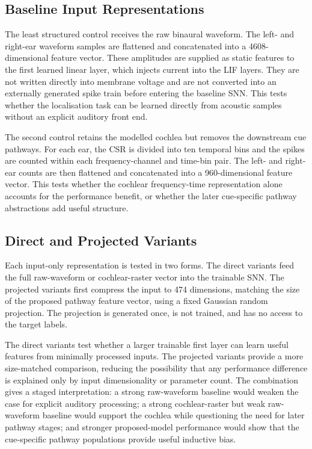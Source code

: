 \subsection{Baseline Input Representations}

The least structured control receives the raw binaural waveform. The left- and right-ear waveform samples are flattened and concatenated into a 4608-dimensional feature vector. These amplitudes are supplied as static features to the first learned linear layer, which injects current into the LIF layers. They are not written directly into membrane voltage and are not converted into an externally generated spike train before entering the baseline SNN. This tests whether the localisation task can be learned directly from acoustic samples without an explicit auditory front end.

The second control retains the modelled cochlea but removes the downstream cue pathways. For each ear, the CSR is divided into ten temporal bins and the spikes are counted within each frequency-channel and time-bin pair. The left- and right-ear counts are then flattened and concatenated into a 960-dimensional feature vector. This tests whether the cochlear frequency-time representation alone accounts for the performance benefit, or whether the later cue-specific pathway abstractions add useful structure.

\subsection{Direct and Projected Variants}

Each input-only representation is tested in two forms. The direct variants feed the full raw-waveform or cochlear-raster vector into the trainable SNN. The projected variants first compress the input to 474 dimensions, matching the size of the proposed pathway feature vector, using a fixed Gaussian random projection. The projection is generated once, is not trained, and has no access to the target labels.

The direct variants test whether a larger trainable first layer can learn useful features from minimally processed inputs. The projected variants provide a more size-matched comparison, reducing the possibility that any performance difference is explained only by input dimensionality or parameter count. The combination gives a staged interpretation: a strong raw-waveform baseline would weaken the case for explicit auditory processing; a strong cochlear-raster but weak raw-waveform baseline would support the cochlea while questioning the need for later pathway stages; and stronger proposed-model performance would show that the cue-specific pathway populations provide useful inductive bias.

